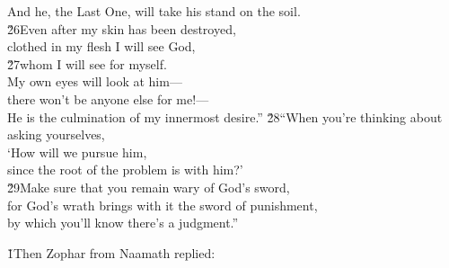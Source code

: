 \begin{poetry}
\poemll    And he, the Last One, will take his stand on the soil. \\
\poeml \v{26}Even after my skin has been destroyed, \\
\poemll    clothed in my flesh I will see God, \\
\poeml \v{27}whom I will see for myself. \\
\poeml My own eyes will look at him--- \\
\poemll    there won't be anyone else for me!--- \\
\poemlll       He is the culmination of my innermost desire.''
\poeml \v{28}``When you're thinking about asking yourselves, \\
\poemll    `How will we pursue him, \\
\poemlll       since the root of the problem is with him?' \\
\poeml \v{29}Make sure that you remain wary of God's sword, \\
\poemll    for God's wrath brings with it the sword of punishment, \\
\poemlll       by which you'll know there's a judgment.''
\end{poetry}

\v{1}Then Zophar from Naamath replied:

